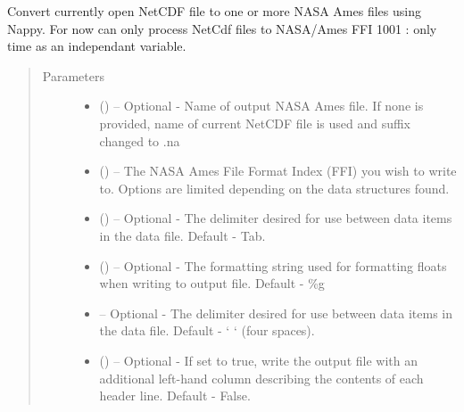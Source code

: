 \documentclass[a4paper,10pt,openany,english]{sphinxmanual}
\begin{document}
\begin{fulllineitems}
\begin{fulllineitems}
\end{fulllineitems}


\begin{fulllineitems}
\label{egadsapi:egads.input.netcdf_io.NetCdf.convert_to_nasa_ames}
Convert currently open NetCDF file to one or more NASA Ames files
using  Nappy. For now can only process NetCdf files to NASA/Ames FFI 1001 : 
only time as an independant variable.
\begin{quote}\begin{description}
\item[{Parameters}] \leavevmode\begin{itemize}
\item {} 
 () -- Optional - Name of output NASA Ames file. If none is provided, name of
current NetCDF file is used and suffix changed to .na

\item {} 
 () -- The NASA Ames File Format Index (FFI) you wish to write to. Options
are limited depending on the data structures found.

\item {} 
 () -- Optional - The delimiter desired for use between data items in the data
file. Default - Tab.

\item {} 
 () -- Optional - The formatting string used for formatting floats when writing
to output file. Default - \%g

\item {} 
 -- Optional - The delimiter desired for use between data items in the data
file. Default - `    ` (four spaces).

\item {} 
 () -- Optional - If set to true, write the output file with an additional left-hand
column describing the contents of each header line. Default - False.


\end{itemize}
\end{description}
\end{quote}
\end{fulllineitems}
\end{fulllineitems}
\end{document}
